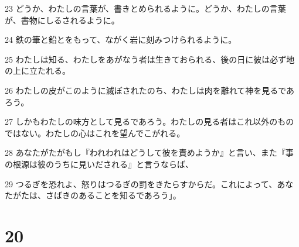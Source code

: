 \par 23 どうか、わたしの言葉が、書きとめられるように。どうか、わたしの言葉が、書物にしるされるように。
\par 24 鉄の筆と鉛とをもって、ながく岩に刻みつけられるように。
\par 25 わたしは知る、わたしをあがなう者は生きておられる、後の日に彼は必ず地の上に立たれる。
\par 26 わたしの皮がこのように滅ぼされたのち、わたしは肉を離れて神を見るであろう。
\par 27 しかもわたしの味方として見るであろう。わたしの見る者はこれ以外のものではない。わたしの心はこれを望んでこがれる。
\par 28 あなたがたがもし『われわれはどうして彼を責めようか』と言い、また『事の根源は彼のうちに見いだされる』と言うならば、
\par 29 つるぎを恐れよ、怒りはつるぎの罰をきたらすからだ。これによって、あなたがたは、さばきのあることを知るであろう」。

\chapter{20}

